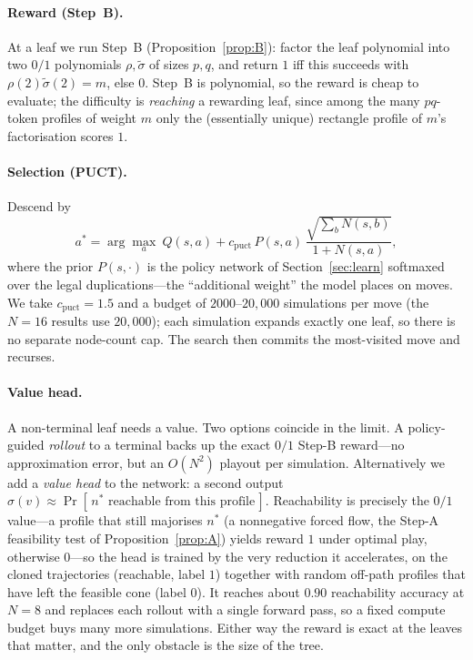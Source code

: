 \documentclass[11pt]{article}
\theoremstyle{definition}
\theoremstyle{plain}
\theoremstyle{remark}
\begin{document}
\paragraph{Reward (Step~B).}
At a leaf we run Step~B (Proposition~\ref{prop:B}): factor the leaf polynomial into two
$0/1$ polynomials $\rho,\tilde\sigma$ of sizes $p,q$, and return $1$ iff this succeeds with
$\rho(2)\tilde\sigma(2)=m$, else $0$. Step~B is polynomial, so the reward is cheap to
evaluate; the difficulty is \emph{reaching} a rewarding leaf, since among the many
$pq$-token profiles of weight $m$ only the (essentially unique) rectangle profile of $m$'s
factorisation scores $1$.

\paragraph{Selection (PUCT).}
Descend by
\[
a^{*}=\arg\max_{a}\ Q(s,a)+c_{\mathrm{puct}}\,P(s,a)\,
\frac{\sqrt{\sum_b N(s,b)}}{1+N(s,a)},
\]
where the prior $P(s,\cdot)$ is the policy network of Section~\ref{sec:learn} softmaxed over
the legal duplications---the ``additional weight'' the model places on moves. We take
$c_{\mathrm{puct}}=1.5$ and a budget of $2000$--$20{,}000$ simulations per move (the $N=16$
results use $20{,}000$); each simulation expands exactly one leaf, so there is no separate
node-count cap. The search then commits the most-visited move and recurses.

\paragraph{Value head.}
A non-terminal leaf needs a value. Two options coincide in the limit. A policy-guided
\emph{rollout} to a terminal backs up the exact $0/1$ Step-B reward---no approximation error,
but an $O(N^2)$ playout per simulation. Alternatively we add a \emph{value head} to the
network: a second output $\sigma(v)\approx\Pr[\,n^{*}\text{ reachable from this profile}\,]$.
Reachability is precisely the $0/1$ value---a profile that still majorises $n^{*}$ (a
nonnegative forced flow, the Step-A feasibility test of Proposition~\ref{prop:A}) yields
reward $1$ under optimal play, otherwise $0$---so the head is trained by the very reduction it
accelerates, on the cloned trajectories (reachable, label $1$) together with random off-path
profiles that have left the feasible cone (label $0$). It reaches about $0.90$ reachability
accuracy at $N=8$ and replaces each rollout with a single forward pass, so a fixed compute
budget buys many more simulations. Either way the reward is exact at the leaves that matter,
and the only obstacle is the size of the tree.
\end{document}
